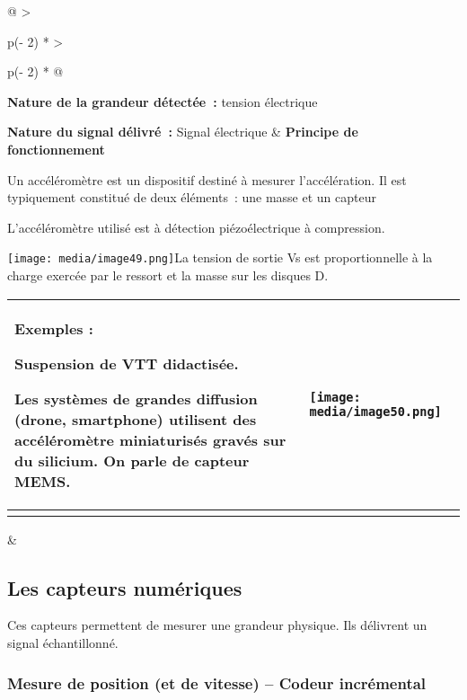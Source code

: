 \documentclass[
]{article}
\begin{document}
\begin{longtable}[]{@{}
  >{\raggedright\arraybackslash}p{(\columnwidth - 2\tabcolsep) * }
  >{\raggedright\arraybackslash}p{(\columnwidth - 2\tabcolsep) * }@{}}
\toprule
\textbf{Nature de la grandeur détectée~:} tension électrique

\textbf{Nature du signal délivré~:} Signal électrique & \textbf{Principe
de fonctionnement}

Un accéléromètre est un dispositif destiné à mesurer l'accélération. Il
est typiquement constitué de deux éléments~: une masse et un capteur

L'accéléromètre utilisé est à détection piézoélectrique à compression.

\texttt{[image: media/image49.png]}La
tension de sortie Vs est proportionnelle à la charge exercée par le
ressort et la masse sur les disques D. \\
\midrule
\endhead
\begin{minipage}[t]{\linewidth}\raggedright
\begin{longtable}[]{@{}
  >{\raggedright\arraybackslash}p{}
  >{\raggedright\arraybackslash}p{}@{}}
\toprule
\textbf{Exemples :}

Suspension de VTT didactisée.

Les systèmes de grandes diffusion (drone, smartphone) utilisent des
accéléromètre miniaturisés gravés sur du silicium. On parle de capteur
MEMS. &
\texttt{[image: media/image50.png]} \\
\midrule
\endhead
& \\
\bottomrule
\end{longtable}
\end{minipage} & \\
\bottomrule
\end{longtable}

\hypertarget{les-capteurs-numuxe9riques}{%
\subsection{Les capteurs numériques}\label{les-capteurs-numuxe9riques}}

Ces capteurs permettent de mesurer une grandeur physique. Ils délivrent
un signal échantillonné.

\hypertarget{mesure-de-position-et-de-vitesse-codeur-incruxe9mental}{%
\subsubsection{Mesure de position (et de vitesse) -- Codeur
incrémental}\label{mesure-de-position-et-de-vitesse-codeur-incruxe9mental}}
\end{document}
